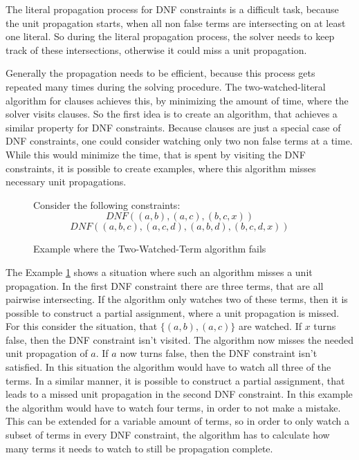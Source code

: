 The literal propagation process for DNF constraints is a difficult task, because the unit propagation starts, when all non false terms are intersecting on at least one literal. So during the literal propagation process, the solver needs to keep track of these intersections, otherwise it could miss a unit propagation. 

Generally the propagation needs to be efficient, because this process gets repeated many times during the solving procedure. The two-watched-literal algorithm for clauses achieves this, by minimizing the amount of time, where the solver visits clauses. So the first idea is to create an algorithm, that achieves a similar property for DNF constraints. Because clauses are just a special case of DNF constraints, one could consider watching only two non false terms at a time. While this would minimize the time, that is spent by visiting the DNF constraints, it is possible to create examples, where this algorithm misses necessary unit propagations.

\begin{figure}[!htb]
\begin{leftbar}
Consider the following constraints:
\begin{displaymath}
DNF ((a,b),(a,c),(b,c,x))
\end{displaymath}
\begin{displaymath}
DNF ((a,b,c),(a,c,d),(a,b,d),(b,c,d,x))
\end{displaymath}
\end{leftbar}
\caption{Example where the Two-Watched-Term algorithm fails}
\label{ex:NotPropagationComplete}
\end{figure}

The Example \ref{ex:NotPropagationComplete} shows a situation where such an algorithm misses a unit propagation. In the first DNF constraint there are three terms, that are all pairwise intersecting. If the algorithm only watches two of these terms, then it is possible to construct a partial assignment, where a unit propagation is missed. For this consider the situation, that $\{(a,b),(a,c)\}$ are watched. If $x$ turns false, then the DNF constraint isn't visited. The algorithm now misses the needed unit propagation of $a$. If $a$ now turns false, then the DNF constraint isn't satisfied. In this situation the algorithm would have to watch all three of the terms.
In a similar manner, it is possible to construct a partial assignment, that leads to a missed unit propagation in the second DNF constraint. In this example the algorithm would have to watch four terms, in order to not make a mistake. This can be extended for a variable amount of terms, so in order to only watch a subset of terms in every DNF constraint, the algorithm has to calculate how many terms it needs to watch to still be propagation complete. 

